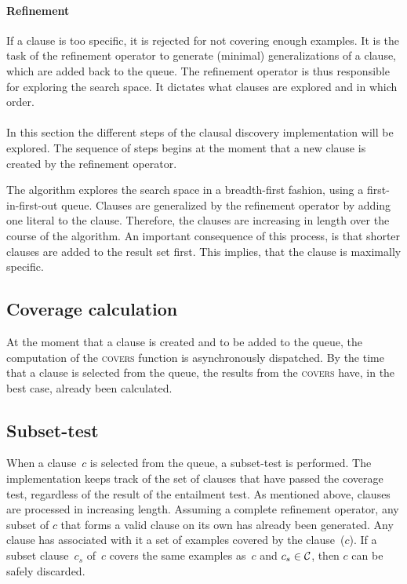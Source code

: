 \paragraph{Refinement}
If a clause is too specific, it is rejected for not covering enough examples.
It is the task of the refinement operator to generate (minimal) generalizations of a clause, which are added back to the queue.
The refinement operator is thus responsible for exploring the search space.
It dictates what clauses are explored and in which order.
\\\\
In this section the different steps of the clausal discovery implementation will be explored.
The sequence of steps begins at the moment that a new clause is created by the refinement operator.

The algorithm explores the search space in a breadth-first fashion, using a first-in-first-out queue.
Clauses are generalized by the refinement operator by adding one literal to the clause.
Therefore, the clauses are increasing in length over the course of the algorithm.
An important consequence of this process, is that shorter clauses are added to the result set first.
This implies, that the clause is maximally specific.

\subsection{Coverage calculation}
At the moment that a clause is created and to be added to the queue, the computation of the \textsc{covers} function is asynchronously dispatched.
By the time that a clause is selected from the queue, the results from the \textsc{covers} have, in the best case, already been calculated.

\subsection{Subset-test}
When a clause~$c$ is selected from the queue, a subset-test is performed.
The implementation keeps track of the set of clauses  that have passed the coverage test, regardless of the result of the entailment test.
As mentioned above, clauses are processed in increasing length.
Assuming a complete refinement operator, any subset of $c$ that forms a valid clause on its own has already been generated.
Any clause has associated with it a set of examples covered by the clause~($c$).
If a subset clause~$c_s$ of~$c$ covers the same examples as~$c$ and $c_s \in \mathcal{C}$, then $c$ can be safely discarded.

